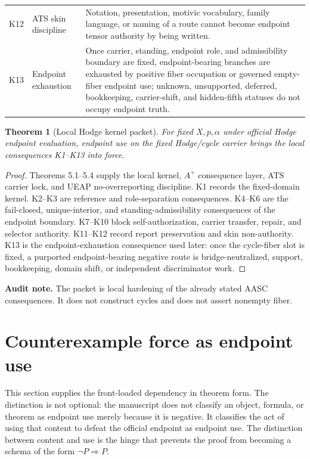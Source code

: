 \documentclass[11pt]{article}
\newtheorem{theorem}{Theorem}[section]
\begin{document}
{\begin{longtable}{p{}p{}p{}}
K12 & ATS skin discipline & Notation, presentation, motivic vocabulary, family language, or naming of a route cannot become endpoint tensor authority by being written.\\
K13 & Endpoint exhaustion & Once carrier, standing, endpoint role, and admissibility boundary are fixed, endpoint-bearing branches are exhausted by positive fiber occupation or governed empty-fiber endpoint use; unknown, unsupported, deferred, bookkeeping, carrier-shift, and hidden-fifth statuses do not occupy endpoint truth.\\
\bottomrule
\end{longtable}
}

\begin{theorem}[Local Hodge kernel packet]
For fixed $X,p,\alpha$ under official Hodge endpoint evaluation, endpoint use on the fixed Hodge/cycle carrier brings the local consequences K1--K13 into force.
\end{theorem}
\begin{proof}
Theorems 5.1--5.4 supply the local kernel, $A^+$ consequence layer, ATS carrier lock, and UEAP no-overreporting discipline.  K1 records the fixed-domain kernel.  K2--K3 are reference and role-separation consequences.  K4--K6 are the fail-closed, unique-interior, and standing-admissibility consequences of the endpoint boundary.  K7--K10 block self-authorization, carrier transfer, repair, and selector authority.  K11--K12 record report preservation and skin non-authority.  K13 is the endpoint-exhaustion consequence used later: once the cycle-fiber slot is fixed, a purported endpoint-bearing negative route is bridge-neutralized, support, bookkeeping, domain shift, or independent discriminator work.
\end{proof}
\par\noindent\textbf{Audit note.} The packet is local hardening of the already stated AASC consequences.  It does not construct cycles and does not assert nonempty fiber.

\section{Counterexample force as endpoint use}

This section supplies the front-loaded dependency in theorem form.  The distinction is not optional: the manuscript does not classify an object, formula, or theorem as endpoint use merely because it is negative.  It classifies the act of using that content to defeat the official endpoint as endpoint use.  The distinction between content and use is the hinge that prevents the proof from becoming a schema of the form $\neg P\Rightarrow P$.
\end{document}
